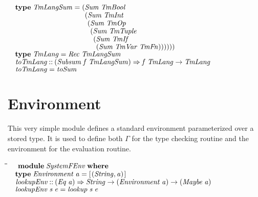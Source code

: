 \documentclass[10pt]{article}
\newlength{\lwidth}\setlength{\lwidth}{4.5cm}
\newlength{\cwidth}\setlength{\cwidth}{8mm} %
\newcommand{\Conid}[1]{\mathit{#1}}
\newcommand{\Varid}[1]{\mathit{#1}}
\begin{document}
\begin{tabbing}
${}$\\
${\hskip1.00em\relax\mathbf{type}\;\Conid{TmLangSum}\mathrel{=}(\Conid{Sum}\;\Conid{TmBool}}$\\
${\hskip1.00em\relax\phantom{\mathbf{type}\;\Conid{TmLangSum}\mathrel{=}(\mbox{}}(\Conid{Sum}\;\Conid{TmInt}}$\\
${\hskip1.00em\relax\phantom{\mathbf{type}\;\Conid{TmLangSum}\mathrel{=}(\mbox{}}\phantom{(\mbox{}}(\Conid{Sum}\;\Conid{TmOp}}$\\
${\hskip1.00em\relax\phantom{\mathbf{type}\;\Conid{TmLangSum}\mathrel{=}(\mbox{}}\phantom{(\mbox{}}\phantom{(\mbox{}}(\Conid{Sum}\;\Conid{TmTuple}}$\\
${\hskip1.00em\relax\phantom{\mathbf{type}\;\Conid{TmLangSum}\mathrel{=}(\mbox{}}\phantom{(\mbox{}}\phantom{(\mbox{}}\phantom{(\mbox{}}(\Conid{Sum}\;\Conid{TmIf}}$\\
${\hskip1.00em\relax\phantom{\mathbf{type}\;\Conid{TmLangSum}\mathrel{=}(\mbox{}}\phantom{(\mbox{}}\phantom{(\mbox{}}\phantom{(\mbox{}}\phantom{(\mbox{}}(\Conid{Sum}\;\Conid{TmVar}\;\Conid{TmFn}))))))}$\\
${}$\\
${\hskip1.00em\relax\mathbf{type}\;\Conid{TmLang}\mathrel{=}\Conid{Rec}\;\Conid{TmLangSum}}$\\
${}$\\
${}$\\
${\hskip1.00em\relax\Varid{toTmLang}\mathbin{::}(\Conid{Subsum}\;\Varid{f}\;\Conid{TmLangSum})\Rightarrow \Varid{f}\;\Conid{TmLang}\to \Conid{TmLang}}$\\
${\hskip1.00em\relax\Varid{toTmLang}\mathrel{=}\Varid{toSum}}$
\end{tabbing}
\section{Environment}

This very simple module defines a standard environment parameterized
over a stored type.  It is used to define both \ensuremath{\Varid{\Gamma}} for the type
checking routine and the environment for the evaluation routine.

\begin{tabbing}
\qquad\=\hspace{\lwidth}\=\hspace{\cwidth}\=\+\kill
${\hskip1.00em\relax\mathbf{module}\;\Conid{SystemFEnv}\;\mathbf{where}}$\\
${}$\\
${\hskip1.00em\relax\mathbf{type}\;\Conid{Environment}\;\Varid{a}\mathrel{=}[\mskip1.5mu (\Conid{String},\Varid{a})\mskip1.5mu]}$\\
${}$\\
${\hskip1.00em\relax\Varid{lookupEnv}\mathbin{::}(\Conid{Eq}\;\Varid{a})\Rightarrow \Conid{String}\to (\Conid{Environment}\;\Varid{a})\to (\Conid{Maybe}\;\Varid{a})}$\\
${\hskip1.00em\relax\Varid{lookupEnv}\;\Varid{s}\;\Varid{e}\mathrel{=}\Varid{lookup}\;\Varid{s}\;\Varid{e}}$
\end{tabbing}
\end{document}
